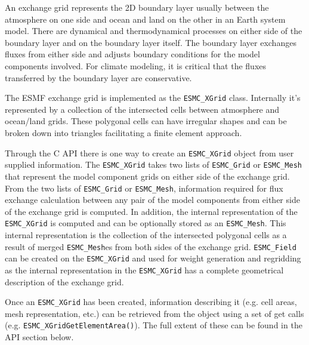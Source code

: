 
\label{sec:xgrid:desc}
An exchange grid represents the 2D boundary layer usually between the
atmosphere on one side and ocean and land on the other in an Earth
system model. There are dynamical and thermodynamical processes on
either side of the boundary layer and on the boundary layer itself.
The boundary layer exchanges fluxes from either side and adjusts
boundary conditions for the model components involved. For climate modeling,
it is critical that the fluxes transferred by the boundary layer are
conservative.

The ESMF exchange grid is implemented as the {\tt ESMC\_XGrid} class. 
Internally it's represented by a collection of the intersected cells
between atmosphere and ocean/land\cite{BalajiXGrid} grids. 
These polygonal cells can have irregular shapes
and can be broken down into triangles facilitating a finite element
approach. 

Through the C API there is one way to create an {\tt ESMC\_XGrid} object from
user supplied information. The {\tt ESMC\_XGrid} takes
two lists of {\tt ESMC\_Grid} or {\tt ESMC\_Mesh} that represent the model component grids on
either side of the exchange grid. From the two lists of {\tt ESMC\_Grid} or {\tt ESMC\_Mesh},
information required for flux exchange calculation between any pair of the 
model components from either side of the exchange grid is computed. In addition, the
internal representation of the {\tt ESMC\_XGrid} is computed and can be optionally stored
as an {\tt ESMC\_Mesh}. This internal representation is the collection of the intersected
polygonal cells as a result of merged {\tt ESMC\_Mesh}es from both sides of the exchange grid.
{\tt ESMC\_Field} can be created on the {\tt ESMC\_XGrid} and used for weight generation
and regridding as the internal representation in the {\tt ESMC\_XGrid} has
a complete geometrical description of the exchange grid.

Once an {\tt ESMC\_XGrid} has been created, information describing it (e.g. cell areas, mesh representation, etc.)
can be retrieved from the object using a set of get calls (e.g. {\tt ESMC\_XGridGetElementArea()}). The full extent of these
can be found in the API section below.  
